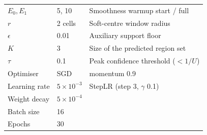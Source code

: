 \documentclass[preprint,12pt]{elsarticle}
\newcommand{\todo}[1]{\textcolor{red}{[\textbf{TODO}: #1]}}
\begin{document}
\begin{table}[h]
\begin{tabular}{lll}
    $E_0, E_1$       & 5, 10      & Smoothness warmup start / full \\
    $r$              & 2 cells    & Soft-centre window radius \\
    $\epsilon$       & 0.01       & Auxiliary support floor \\
    $K$              & 3          & Size of the predicted region set \\
    $\tau$           & 0.1        & Peak confidence threshold ($< 1/U$) \\
    Optimiser        & SGD        & momentum 0.9 \\
    Learning rate    & $5{\times}10^{-3}$ & StepLR (step 3, $\gamma$ 0.1) \\
    Weight decay     & $5{\times}10^{-4}$ & \\
    Batch size       & 16         & \\
    Epochs           & 30         & \\
    \bottomrule
  \end{tabular}
\end{table}





\end{document}

